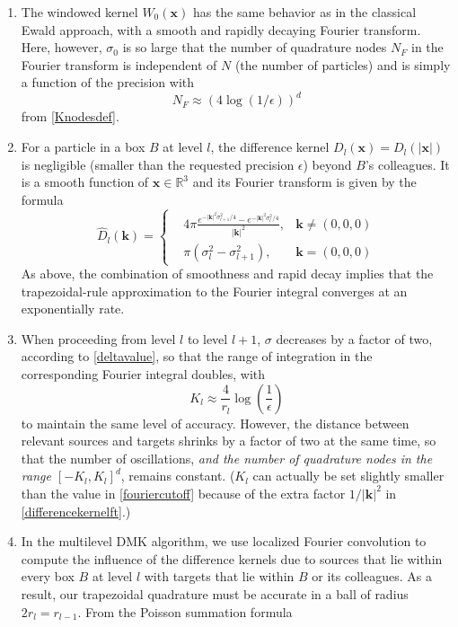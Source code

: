 \documentclass[final,letterpaper]{siamart171218}
\newcommand{\be}{\begin{equation}}
\newcommand{\ee}{\end{equation}}
\newcommand{\x}{\boldsymbol{x}}
\newcommand{\bk}{\boldsymbol{k}}
\newcommand{\acron}{DMK }
\newcommand{\cR}{r}
\begin{document}
\begin{enumerate}[label=(\alph*).]
\item The windowed kernel $W_0(\x)$ has the same behavior 
as in the classical Ewald approach, with a smooth and 
rapidly decaying Fourier transform.
Here, however, $\sigma_0$ is so large that the number of quadrature nodes 
$N_F$ in the Fourier transform
is independent of $N$ (the number of particles) and is simply 
a function of the precision with
\[ N_F \approx (4 \log(1/\epsilon))^d  \]
from \eqref{Knodesdef}.
\item For a particle in a box  $B$ at level $l$,
the difference kernel $D_l(\x) = D_l(|\x|)$ is negligible
(smaller than the requested precision $\epsilon$) beyond $B$'s colleagues. 
It is a smooth function of $\x\in\mathbb{R}^3$
and its Fourier transform is given by the formula
\be\label{differencekernelft}
\hat{D}_l(\bk) =\left\{\begin{aligned}& 4\pi
\frac{e^{-|\bk|^2 \sigma_{l+1}^2/4}-e^{-|\bk|^2 \sigma_{l}^2/4}}{|\bk|^2},& \bk\ne (0,0,0)\\
&  \pi(\sigma_l^2-\sigma_{l+1}^2),
 & \bk=(0,0,0)\end{aligned}\right.
\ee
As above, the combination of smoothness and rapid decay implies that 
the trapezoidal-rule approximation to the Fourier integral 
converges at an exponentially rate.
\item
When proceeding from level $l$ to level $l+1$, $\sigma$ decreases by a
factor of two, according to \eqref{deltavalue}, so that
the range of integration in the corresponding Fourier integral
doubles, with
\be\label{fouriercutoff}
K_l \approx \frac{4}{\cR_l}\log\left(\frac{1}{\epsilon}\right)
\ee
to maintain the same level of accuracy.
However,
the distance between relevant sources and targets
shrinks by a factor of two at the same time, so that the number of oscillations,
{\em and the number of quadrature nodes in the range $[-K_l,K_l]^d$},
remains constant. %
($K_l$ can actually be set slightly smaller than 
the value in \eqref{fouriercutoff} because of the extra factor $1/|\bk|^2$ in
\eqref{differencekernelft}.)
%
\item In the multilevel \acron algorithm, we use localized
Fourier convolution to compute the influence of the difference kernels
due to sources that lie within every box $B$ at level $l$ with targets that lie within $B$
or its colleagues. As a result, 
our trapezoidal quadrature must be accurate in a ball of radius
$2\cR_l = \cR_{l-1}$.
From the Poisson summation formula

\end{enumerate}
\end{document}

